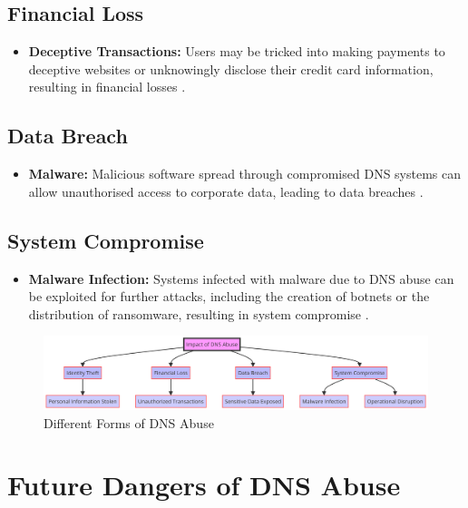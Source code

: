 \subsection{Financial Loss}
\begin{itemize}
    \item \textbf{Deceptive Transactions:} Users may be tricked into making payments to deceptive websites or unknowingly disclose their credit card information, resulting in financial losses \cite{bohme2013economics}.
\end{itemize}

\subsection{Data Breach}
\begin{itemize}
    \item \textbf{Malware:} Malicious software spread through compromised DNS systems can allow unauthorised access to corporate data, leading to data breaches \cite{fowler2016data}.
\end{itemize}

\subsection{System Compromise}
\begin{itemize}
    \item \textbf{Malware Infection:} Systems infected with malware due to DNS abuse can be exploited for further attacks, including the creation of botnets or the distribution of ransomware, resulting in system compromise \cite{saxe2018malware}.
\end{itemize}
\captionsetup{font= footnotesize}
\begin{figure}[H]
\centering
\includegraphics[width=1.0\textwidth]{background/DNSabuseHarm.png}
\caption{Different Forms of DNS Abuse}
\label{fig:figureFour}
\end{figure}


\section{Future Dangers of DNS Abuse}

